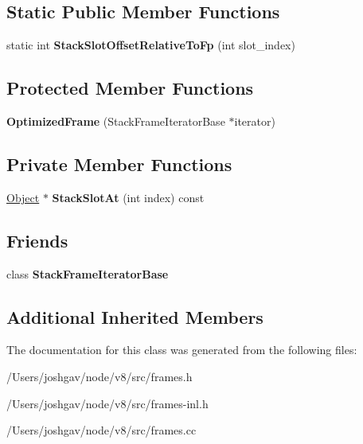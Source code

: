 \subsection*{Static Public Member Functions}
\begin{DoxyCompactItemize}
\item 
static int {\bfseries Stack\+Slot\+Offset\+Relative\+To\+Fp} (int slot\+\_\+index)\hypertarget{classv8_1_1internal_1_1_optimized_frame_adff8cbaa5829ce12dc64a4544769577a}{}\label{classv8_1_1internal_1_1_optimized_frame_adff8cbaa5829ce12dc64a4544769577a}

\end{DoxyCompactItemize}
\subsection*{Protected Member Functions}
\begin{DoxyCompactItemize}
\item 
{\bfseries Optimized\+Frame} (Stack\+Frame\+Iterator\+Base $\ast$iterator)\hypertarget{classv8_1_1internal_1_1_optimized_frame_a1bbc29fa53c627003b0536cbaaadd379}{}\label{classv8_1_1internal_1_1_optimized_frame_a1bbc29fa53c627003b0536cbaaadd379}

\end{DoxyCompactItemize}
\subsection*{Private Member Functions}
\begin{DoxyCompactItemize}
\item 
\hyperlink{classv8_1_1internal_1_1_object}{Object} $\ast$ {\bfseries Stack\+Slot\+At} (int index) const \hypertarget{classv8_1_1internal_1_1_optimized_frame_a6d7a6f04f079c56d8278d3f91d55117e}{}\label{classv8_1_1internal_1_1_optimized_frame_a6d7a6f04f079c56d8278d3f91d55117e}

\end{DoxyCompactItemize}
\subsection*{Friends}
\begin{DoxyCompactItemize}
\item 
class {\bfseries Stack\+Frame\+Iterator\+Base}\hypertarget{classv8_1_1internal_1_1_optimized_frame_ac7310421866976ca454bbe11c5f926c3}{}\label{classv8_1_1internal_1_1_optimized_frame_ac7310421866976ca454bbe11c5f926c3}

\end{DoxyCompactItemize}
\subsection*{Additional Inherited Members}


The documentation for this class was generated from the following files\+:\begin{DoxyCompactItemize}
\item 
/\+Users/joshgav/node/v8/src/frames.\+h\item 
/\+Users/joshgav/node/v8/src/frames-\/inl.\+h\item 
/\+Users/joshgav/node/v8/src/frames.\+cc\end{DoxyCompactItemize}
